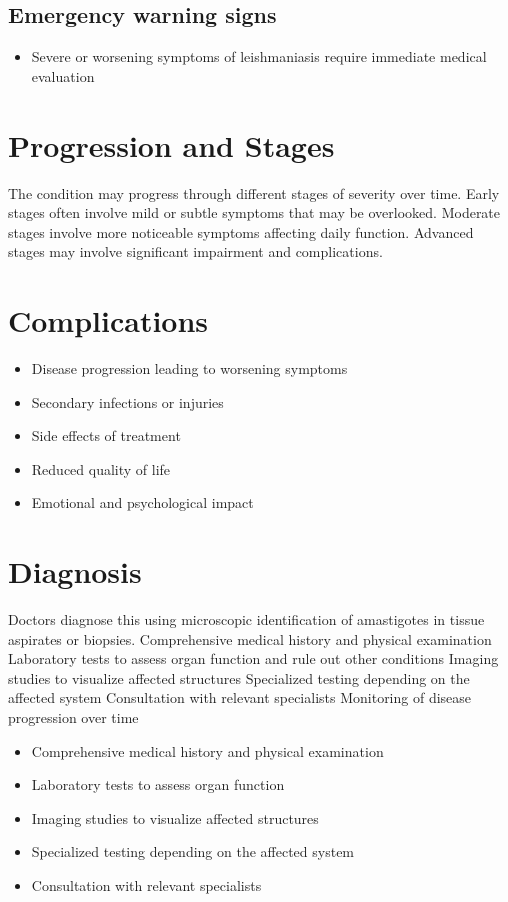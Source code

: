 \subsection{Emergency warning signs}
\begin{itemize}[noitemsep]
  \item Severe or worsening symptoms of leishmaniasis require immediate medical evaluation
\end{itemize}
\section{Progression and Stages}
The condition may progress through different stages of severity over time. Early stages often involve mild or subtle symptoms that may be overlooked. Moderate stages involve more noticeable symptoms affecting daily function. Advanced stages may involve significant impairment and complications.
\section{Complications}
\begin{itemize}[noitemsep]
  \item Disease progression leading to worsening symptoms
  \item Secondary infections or injuries
  \item Side effects of treatment
  \item Reduced quality of life
  \item Emotional and psychological impact
\end{itemize}
\section{Diagnosis}
Doctors diagnose this using microscopic identification of amastigotes in tissue aspirates or biopsies. Comprehensive medical history and physical examination Laboratory tests to assess organ function and rule out other conditions Imaging studies to visualize affected structures Specialized testing depending on the affected system Consultation with relevant specialists Monitoring of disease progression over time

\begin{itemize}[noitemsep]
  \item Comprehensive medical history and physical examination
  \item Laboratory tests to assess organ function
  \item Imaging studies to visualize affected structures
  \item Specialized testing depending on the affected system
  \item Consultation with relevant specialists
\end{itemize}
